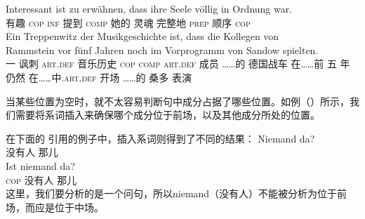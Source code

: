 \ex
\gll Interessant ist zu erwähnen, dass ihre Seele völlig in Ordnung war.\\
	 有趣 \textsc{cop} \textsc{inf} 提到 \textsc{comp} 她的 灵魂 完整地 \textsc{prep} 顺序 \textsc{cop}\\
\ex %
\gll Ein Treppenwitz der Musikgeschichte ist, dass die Kollegen von~~~~~~~~~~~ Rammstein vor fünf Jahren noch im Vorprogramm von Sandow spielten.\hspace{-5pt}\\
	 一 讽刺 \textsc{art}.\textsc{def} 音乐历史 \textsc{cop} \textsc{comp} \textsc{art}.\textsc{def} 成员 ……的 德国战车 在……前 五 年 仍然 在……中.\textsc{art}.\textsc{def} 开场 ……的 桑多 表演\\
\zl

当某些位置为空时，就不太容易判断句中成分占据了哪些位置。如例（）所示，我们需要将系词插入来确保哪个成分位于前场，以及其他成分所处的位置。

在下面的 \citet[]{Paul1919a}引用的例子中，插入系词则得到了不同的结果：
\eal
\ex 
\gll Niemand da?\\
	 没有人 那儿\\
\ex 
\gll Ist niemand da?\\
	 \textsc{cop} 没有人 那儿\\
\zl
这里，我们要分析的是一个问句，所以niemand（没有人）不能被分析为位于前场，而应是位于中场。

